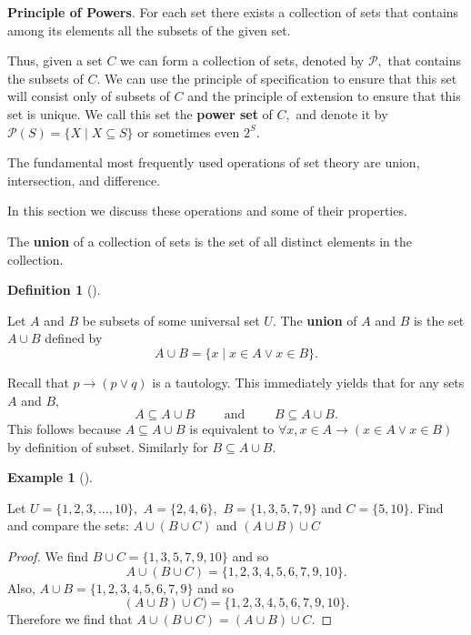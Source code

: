 \documentclass[
  letterpaper,
  10pt,
  reqno,
  twopage,
  openany]{book}
\theoremstyle{plain}
\theoremstyle{definition}
\theoremstyle{definition}
\newtheorem{definition}{Definition}[chapter]
\theoremstyle{definition}
\newtheorem{example}{Example}[chapter]
\theoremstyle{plain}
\theoremstyle{plain}
\theoremstyle{remark}
\begin{document}
\textbf{Principle of Powers}. For each set there exists a collection of
sets that contains among its elements all the subsets of the given set.

Thus, given a set \(C\) we can form a collection of sets, denoted by
\(\mathcal{P},\) that contains the subsets of \(C.\) We can use the
principle of specification to ensure that this set will consist only of
subsets of \(C\) and the principle of extension to ensure that this set
is unique. We call this set the  \textbf{power set} of
\(C,\) and denote it by \(\mathcal{P}(S)=\{X \mid X\subseteq S\}\) or
sometimes even \(2^S.\)

The fundamental most frequently used operations of set theory are union,
intersection, and difference.

In this section we discuss these operations and some of their
properties.

The  \textbf{union} of a collection of sets is the set of
all distinct elements in the collection.

\leavevmode{}%
\begin{definition}[]\label{def-union}

Let \(A\) and \(B\) be subsets of some universal set \(U.\) The
 \textbf{union} of \(A\) and \(B\) is the set \(A\cup B\)
defined by \[
A\cup B =\{x\mid x\in A \lor x\in B\}.
\]

\end{definition}

Recall that \(p\rightarrow (p\lor q)\) is a tautology. This immediately
yields that for any sets \(A\) and \(B,\) \begin{equation}
\label{subsetcup}
A\subseteq A\cup B
\qquad \text{ and } \qquad 
B\subseteq A\cup B. 
\end{equation} This follows because \(A\subseteq A\cup B\) is equivalent
to \(\forall x, x\in A\rightarrow (x\in A \lor x\in B)\) by definition
of subset. Similarly for \(B\subseteq A\cup B.\)

\leavevmode{}%
\begin{example}[]\label{exm-union}

Let \(U=\{1,2,3,\ldots, 10\},\) \(A=\{2,4,6\},\) \(B=\{1,3,5,7,9\}\) and
\(C=\{5,10\}.\) Find and compare the sets: \(A\cup (B \cup C)\) and
\((A\cup B)\cup C\)

\end{example}

\begin{proof}

We find \(B\cup C=\{1,3,5,7,9,10\}\) and so \[
A\cup(B\cup C)=\{1,2,3,4,5,6,7,9,10\}.
\] Also, \(A\cup B=\{1,2,3,4,5,6,7,9\}\) and so \[
(A\cup B)\cup C)=\{1,2,3,4,5,6,7,9,10\}.
\] Therefore we find that \(A\cup (B \cup C)=(A\cup B)\cup C\).

\end{proof}
\end{document}
